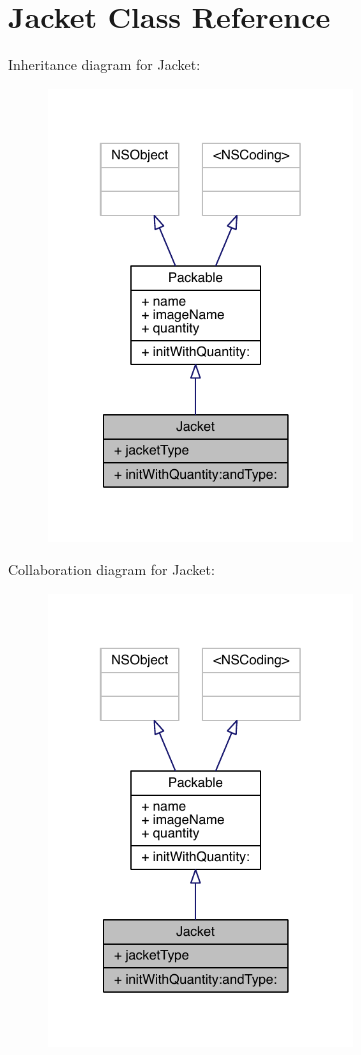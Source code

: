 \hypertarget{interface_jacket}{\section{Jacket Class Reference}
\label{interface_jacket}
}


Inheritance diagram for Jacket\-:\nopagebreak
\begin{figure}[H]
\begin{center}
\leavevmode
\includegraphics[width=229pt]{interface_jacket__inherit__graph}
\end{center}
\end{figure}


Collaboration diagram for Jacket\-:\nopagebreak
\begin{figure}[H]
\begin{center}
\leavevmode
\includegraphics[width=229pt]{interface_jacket__coll__graph}
\end{center}
\end{figure}

